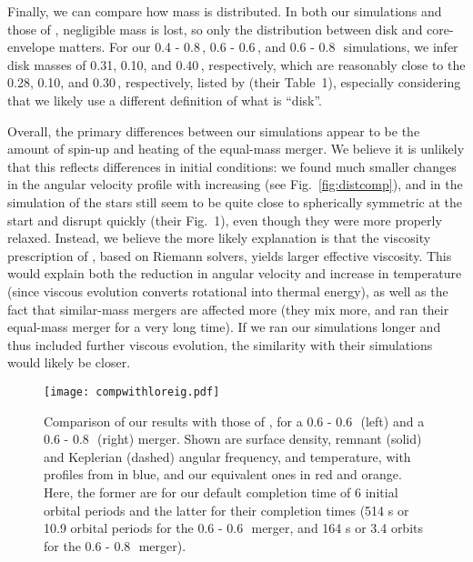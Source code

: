 Finally, we can compare how mass is distributed.  In both our simulations and those of \citeal{loreig09}, negligible mass is lost, so only the distribution between disk and core-envelope matters.  For our 0.4 - 0.8\,\Msun, 0.6 - 0.6\,\Msun, and 0.6 - 0.8\,\Msun\ simulations, we infer disk masses  of 0.31, 0.10, and 0.40\,\Msun, respectively, which are reasonably close to the 0.28, 0.10, and 0.30\,\Msun, respectively, listed by \citeal{loreig09} (their Table~1), especially considering that we likely use a different definition of what is ``disk''.

Overall, the primary differences between our simulations appear to be the amount of spin-up and heating of the equal-mass merger.  We believe it is unlikely that this reflects differences in initial conditions: we found much smaller changes in the angular velocity profile with increasing {\azero} (see Fig.~\ref{fig:distcomp}), and in the simulation of \citeal{loreig09} the stars still seem to be quite close to spherically symmetric at the start and disrupt quickly (their Fig.~1), even though they were more properly relaxed.  Instead, we believe the more likely explanation is that the viscosity prescription of \citeal{loreig09}, based on Riemann solvers, yields larger effective viscosity.  This would explain both the reduction in angular velocity and increase in temperature (since viscous evolution converts rotational into thermal energy), as well as the fact that similar-mass mergers are affected more (they mix more, and \citeal{loreig09} ran their equal-mass merger for a very long time).  If we ran our simulations longer and thus included further viscous evolution, the similarity with their simulations would likely be closer.

\begin{figure}
\centering
\texttt{[image: compwithloreig.pdf]}
\caption{Comparison of our results with those of , for a 0.6 - 0.6\,\Msun\ (left) and a 0.6 - 0.8\,\Msun\ (right) merger.  Shown are surface density, remnant (solid) and Keplerian (dashed) angular frequency, and temperature, with profiles from  in blue, and our equivalent ones in red and orange.  Here, the former are for our default completion time of 6 initial orbital periods and the latter for their completion times (514 s or 10.9 orbital periods for the 0.6 - 0.6\,\Msun\ merger, and 164 s or 3.4 orbits for the 0.6 - 0.8\,\Msun\ merger).}
\label{fig:compwithloreig}
\end{figure}

